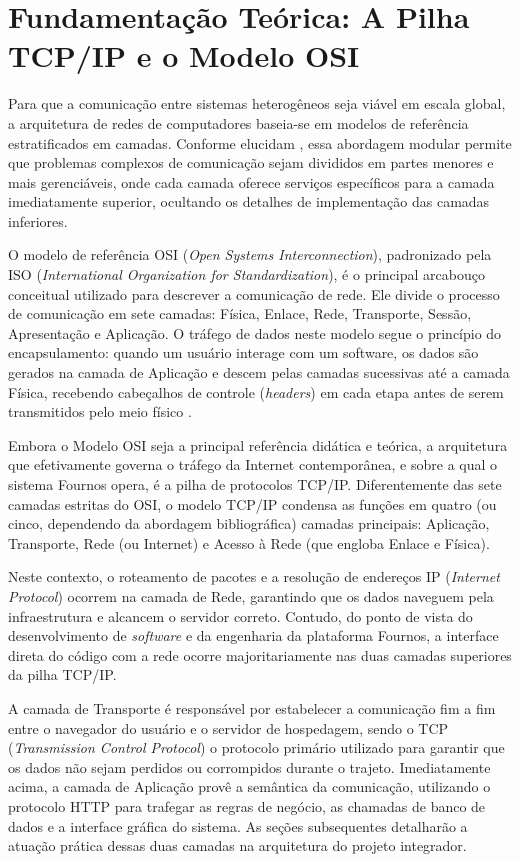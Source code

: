 \documentclass[12pt, a4paper]{article}
\begin{document}
\section{Fundamentação Teórica: A Pilha TCP/IP e o Modelo OSI}

Para que a comunicação entre sistemas heterogêneos seja viável em escala global, a arquitetura de redes de computadores baseia-se em modelos de referência estratificados em camadas. Conforme elucidam \cite{kurose}, essa abordagem modular permite que problemas complexos de comunicação sejam divididos em partes menores e mais gerenciáveis, onde cada camada oferece serviços específicos para a camada imediatamente superior, ocultando os detalhes de implementação das camadas inferiores.

O modelo de referência OSI (\textit{Open Systems Interconnection}), padronizado pela ISO (\textit{International Organization for Standardization}), é o principal arcabouço conceitual utilizado para descrever a comunicação de rede. Ele divide o processo de comunicação em sete camadas: Física, Enlace, Rede, Transporte, Sessão, Apresentação e Aplicação. O tráfego de dados neste modelo segue o princípio do encapsulamento: quando um usuário interage com um software, os dados são gerados na camada de Aplicação e descem pelas camadas sucessivas até a camada Física, recebendo cabeçalhos de controle (\textit{headers}) em cada etapa antes de serem transmitidos pelo meio físico \cite{tanenbaum}.

Embora o Modelo OSI seja a principal referência didática e teórica, a arquitetura que efetivamente governa o tráfego da Internet contemporânea, e sobre a qual o sistema Fournos opera, é a pilha de protocolos TCP/IP. Diferentemente das sete camadas estritas do OSI, o modelo TCP/IP condensa as funções em quatro (ou cinco, dependendo da abordagem bibliográfica) camadas principais: Aplicação, Transporte, Rede (ou Internet) e Acesso à Rede (que engloba Enlace e Física). 

Neste contexto, o roteamento de pacotes e a resolução de endereços IP (\textit{Internet Protocol}) ocorrem na camada de Rede, garantindo que os dados naveguem pela infraestrutura e alcancem o servidor correto. Contudo, do ponto de vista do desenvolvimento de \textit{software} e da engenharia da plataforma Fournos, a interface direta do código com a rede ocorre majoritariamente nas duas camadas superiores da pilha TCP/IP.

A camada de Transporte é responsável por estabelecer a comunicação fim a fim entre o navegador do usuário e o servidor de hospedagem, sendo o TCP (\textit{Transmission Control Protocol}) o protocolo primário utilizado para garantir que os dados não sejam perdidos ou corrompidos durante o trajeto. Imediatamente acima, a camada de Aplicação provê a semântica da comunicação, utilizando o protocolo HTTP para trafegar as regras de negócio, as chamadas de banco de dados e a interface gráfica do sistema. As seções subsequentes detalharão a atuação prática dessas duas camadas na arquitetura do projeto integrador.
\end{document}
